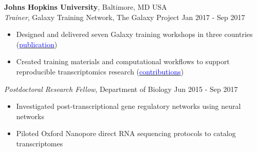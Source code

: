 \documentclass[margin,line]{res}
\begin{document}
\begin{resume}
{\bf Johns Hopkins University}, Baltimore, MD USA\\
{\em Trainer}, Galaxy Training Network, The Galaxy Project \hfill {Jan 2017 - Sep 2017}
\begin{itemize}
\itemsep0em 
	\item Designed and delivered seven Galaxy training workshops in three countries (\href{https://doi.org/10.1016/j.cels.2018.05.012}{\textcolor{blue}{publication}})
	\item Created training materials and computational workflows to support reproducible transcriptomics research (\href{https://training.galaxyproject.org/training-material/hall-of-fame/malloryfreeberg/}{\textcolor{blue}{contributions}})
\end{itemize}

{\em Postdoctoral Research Fellow}, Department of Biology \hfill {Jun 2015 - Sep 2017}
\begin{itemize}
\itemsep0em 
	\item Investigated post-transcriptional gene regulatory networks using neural networks
	\item Piloted Oxford Nanopore direct RNA sequencing protocols to catalog transcriptomes
\end{itemize}






\end{resume}
\end{document}
